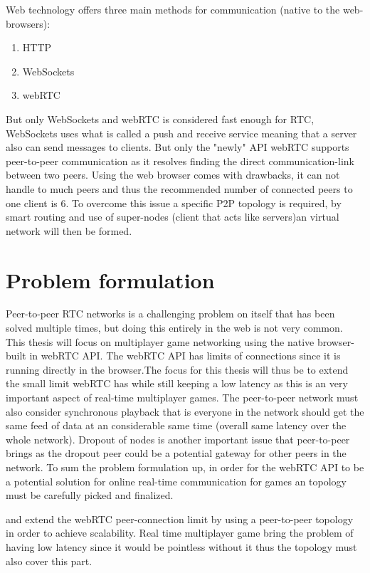 \documentclass[12pt]{article}
\begin{document}
\noindent Web technology offers three main methods for communication (native to the web-browsers):
\begin{enumerate}
  \item HTTP 
  \item WebSockets 
  \item webRTC 
\end{enumerate}

But only WebSockets and webRTC is considered fast enough for RTC, 
WebSockets uses what is called a push and receive service meaning 
that a server also can send messages to clients. But only the "newly" 
API webRTC supports peer-to-peer communication as it resolves finding 
the direct communication-link between two peers. Using the web browser 
comes with drawbacks, it can not handle to much peers and thus the 
recommended number of connected peers to one client is 6. To overcome 
this issue a specific P2P topology is required, by smart routing and 
use of super-nodes (client that acts like servers)an virtual network 
will then be formed.

\pagebreak

\section*{Problem formulation}
Peer-to-peer RTC networks is a challenging problem on itself that has 
been solved multiple times, but doing this entirely in the web is not 
very common. This thesis will focus on multiplayer game networking 
using the native browser-built in webRTC API. The webRTC API has limits 
of connections since it is running directly in the browser.The focus for 
this thesis will thus be to extend the small limit webRTC has while still 
keeping a low latency as this is an very important aspect of real-time 
multiplayer games. The peer-to-peer network must also consider synchronous 
playback that is everyone in the network should get the same feed of data 
at an considerable same time (overall same latency over the whole network). 
Dropout of nodes is another important issue that peer-to-peer brings as 
the dropout peer could be a potential gateway for other peers in the network. 
To sum the problem formulation up, in order for the webRTC API to be a
potential solution for online real-time communication for games an topology
must be carefully picked and finalized.

and extend the webRTC peer-connection limit by using a peer-to-peer 
topology in order to achieve scalability. Real time multiplayer game 
bring the problem of having low latency since it would be pointless 
without it thus the topology must also cover this part.
\end{document}
